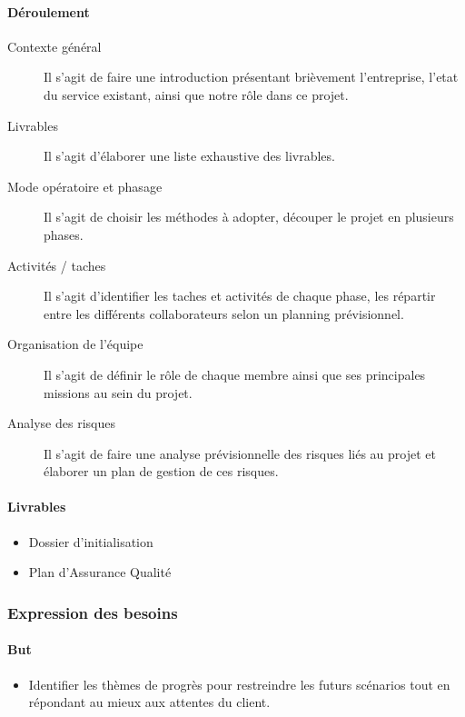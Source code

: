 \paragraph{Déroulement}
\begin{description}
    \item[Contexte général]{
        Il s’agit de faire une introduction présentant brièvement l’entreprise, l’etat du service existant, ainsi que notre rôle dans ce projet.
    }
    \item[Livrables]{
        Il s’agit d’élaborer une liste exhaustive des livrables.
    }
    \item[Mode opératoire et phasage]{
        Il s’agit de choisir les méthodes à adopter, découper le projet en plusieurs phases.
    }
    \item[Activités / taches]{
        Il s’agit d’identifier les taches et activités de chaque phase, les répartir entre les différents collaborateurs selon un planning prévisionnel.
    }
    \item[Organisation de l’équipe]{
        Il s’agit de définir le rôle de chaque membre ainsi que ses principales missions au sein du projet.
    }
    \item[Analyse des risques]{
        Il s’agit de faire une analyse prévisionnelle des risques liés au projet et élaborer un plan de gestion de ces risques.
    }
\end{description}

\paragraph{Livrables}
\begin{itemize}
    \item Dossier d’initialisation
    \item Plan d'Assurance Qualité
\end{itemize}

\subsubsection{Expression des besoins}

\paragraph{But}
\begin{itemize}
    \item Identifier les thèmes de progrès pour restreindre les futurs scénarios tout en répondant au mieux aux attentes du client.
\end{itemize}


